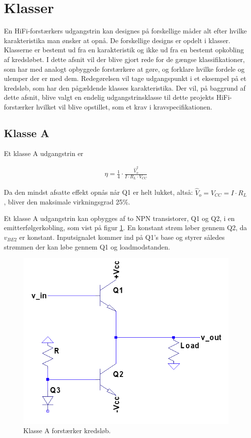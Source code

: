 \section{Klasser}
\label{klasser}
En HiFi-forstærkers udgangstrin kan designes på forskellige måder alt efter hvilke karakteristika man ønsker at opnå. De forskellige designs er opdelt i klasser. Klasserne er bestemt ud fra en karakteristik og ikke ud fra en bestemt opkobling af kredsløbet. 
I dette afsnit vil der blive gjort rede for de gængse klassifikationer, som har med analogt opbyggede forstærkere at gøre, og forklare hvilke fordele og ulemper der er med dem. Redegørelsen vil tage udgangspunkt i et eksempel på et kredsløb, som har den pågældende klasses karakteristika. 
Der vil, på baggrund af dette afsnit, blive valgt en endelig udgangstrinsklasse til dette projekts HiFi-forstærker hvilket vil blive opstillet, som et krav i kravspecifikationen.

\subsection{Klasse A}

Et klasse A udgangstrin er 

\begin{eqnarray}
\eta=\frac{1}{4} \cdot \frac{\hat{V}_o^2}{I \cdot R_L \cdot V_{CC}}  \label{eq:classa}
\end{eqnarray}

Da den mindst afsatte effekt opnås når Q1 er helt lukket, altså: $ \hat{V}_o=V_{CC}=I \cdot R_L $, bliver den maksimale virkningsgrad 25\%.

Et klasse A udgangstrin kan opbygges af to NPN transistorer, Q1 og Q2, i en emitterfølgerkobling, som vist på figur \ref{fig:classa}. En konstant strøm løber gennem Q2, da $v_{BE2}$ er konstant. Inputsignalet kommer ind på Q1's base og styrer således strømmen der kan løbe gennem Q1 og loadmodstanden. 

\begin{figure}[h]
\centering
\includegraphics[scale=.35]{indledende_analyse/klasser/classa.png}
\caption{Klasse A forstærker kredsløb.}
\label{fig:classa}
\end{figure}

